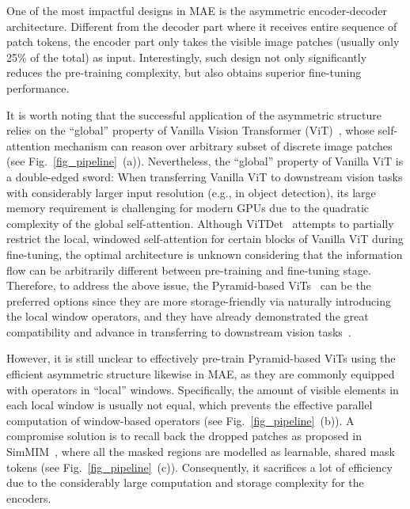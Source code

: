 \documentclass{article}
\begin{document}
One of the most impactful designs in MAE is the asymmetric encoder-decoder architecture. Different from the decoder part where it receives entire sequence of patch tokens, the encoder part only takes the visible image patches (usually only 25\% of the total) as input. Interestingly, such design not only significantly reduces the pre-training complexity, but also obtains superior fine-tuning performance.

It is worth noting that the successful application of the asymmetric structure relies on the ``global'' property of Vanilla Vision Transformer (ViT)~\cite{dosovitskiy2020image}, whose self-attention mechanism can reason over arbitrary subset of discrete image patches (see Fig.~\ref{fig_pipeline}~(a)). Nevertheless, the ``global'' property of Vanilla ViT is a double-edged sword: When transferring Vanilla ViT to downstream vision tasks with considerably larger input resolution (e.g.,  in object detection), its large memory requirement is challenging for modern GPUs due to the quadratic complexity of the global self-attention. Although ViTDet~\cite{li2022exploring,li2021benchmarking} attempts to partially restrict the local, windowed self-attention for certain blocks of Vanilla ViT during fine-tuning, the optimal architecture is unknown considering that the information flow can be arbitrarily different between pre-training and fine-tuning stage. Therefore, to address the above issue, the Pyramid-based ViTs~\cite{liu2021swin,liu2021swinv2,wang2021pyramid,wang2022pvtv2} can be the preferred options since they are more storage-friendly via naturally introducing the local window operators, and they have already demonstrated the great compatibility and advance in transferring to downstream vision tasks~\cite{khan2021transformers}. 


However, it is still unclear to effectively pre-train Pyramid-based ViTs using the efficient asymmetric structure likewise in MAE, as they are commonly equipped with operators in ``local'' windows. Specifically, the amount of visible elements in each local window is usually not equal, which prevents the effective parallel computation of window-based operators (see Fig.~\ref{fig_pipeline}~(b)). A compromise solution is to recall back the dropped patches as proposed in SimMIM~\cite{xie2021simmim}, where all the masked regions are modelled as learnable, shared mask tokens (see Fig.~\ref{fig_pipeline}~(c)). Consequently, it sacrifices a lot of efficiency due to the considerably large computation and storage complexity for the encoders. 
\end{document}
